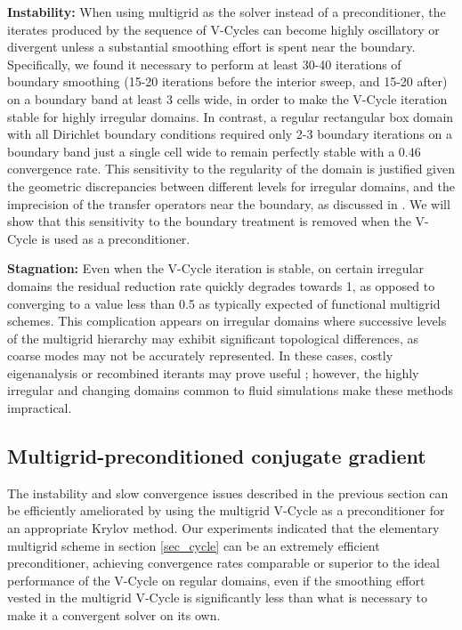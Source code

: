 \noindent\textbf{Instability:} When using multigrid as the solver instead of a preconditioner, the iterates produced by the sequence of V-Cycles can become highly oscillatory or divergent unless a substantial smoothing effort is spent near the
boundary. Specifically, we found it necessary to perform at least 30-40 iterations of boundary smoothing (15-20 iterations before the interior sweep, and 15-20 after) on a boundary band
at least 3 cells wide, in order to make the V-Cycle iteration stable for highly irregular domains. In contrast, a regular rectangular box domain with all Dirichlet boundary conditions
required only 2-3 boundary iterations on a boundary band just a single cell wide to remain perfectly stable with a $0.46$ convergence rate. This sensitivity to the regularity of the
domain is justified given the geometric discrepancies between different levels for irregular domains, and the imprecision of the transfer operators near the boundary, as discussed in \cite{trottenberg:2001:multigrid}. We will show that this sensitivity to the boundary treatment is removed when the V-Cycle is used as a preconditioner.

\noindent\textbf{Stagnation:} Even when the V-Cycle iteration is stable, on certain irregular domains the residual reduction rate quickly degrades towards 1, as opposed to converging to a value
less than 0.5 as typically expected of functional multigrid schemes. This complication appears on irregular domains where successive levels of the multigrid hierarchy may exhibit
significant topological differences, as coarse modes may not be accurately represented.  In these cases,  costly eigenanalysis or recombined iterants may prove useful \cite{trottenberg:2001:multigrid}; however, the highly irregular and changing domains common to fluid simulations make these methods impractical.

\subsection{Multigrid-preconditioned conjugate gradient}
\label{subsec_mgpcg}
The instability and slow convergence issues described in the previous section can be efficiently ameliorated by using the multigrid V-Cycle as a preconditioner for an appropriate Krylov method. 
Our experiments indicated that the elementary multigrid scheme in section \ref{sec_cycle} can be an extremely efficient preconditioner, achieving
convergence rates comparable or superior to the ideal performance of the V-Cycle on regular domains, even if the smoothing effort vested in the multigrid V-Cycle is significantly less than what is necessary
to make it a convergent solver on its own.

